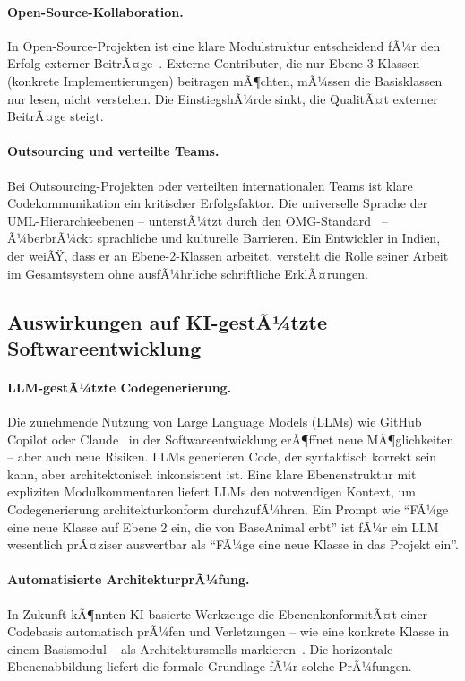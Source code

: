 ﻿\documentclass[a4paper,12pt]{article}
\begin{document}
\paragraph{Open-Source-Kollaboration.}
In Open-Source-Projekten ist eine klare Modulstruktur entscheidend fÃ¼r den
Erfolg externer BeitrÃ¤ge~\cite{raymond1999}. Externe Contributer, die nur
Ebene-3-Klassen (konkrete Implementierungen) beitragen mÃ¶chten, mÃ¼ssen die
Basisklassen nur lesen, nicht verstehen. Die EinstiegshÃ¼rde sinkt, die
QualitÃ¤t externer BeitrÃ¤ge steigt.

\paragraph{Outsourcing und verteilte Teams.}
Bei Outsourcing-Projekten oder verteilten internationalen Teams ist klare
Codekommunikation ein kritischer Erfolgsfaktor. Die universelle Sprache der
UML-Hierarchieebenen -- unterstÃ¼tzt durch den OMG-Standard~\cite{omg2017} --
Ã¼berbrÃ¼ckt sprachliche und kulturelle Barrieren. Ein Entwickler in Indien,
der weiÃŸ, dass er an Ebene-2-Klassen arbeitet, versteht die Rolle seiner
Arbeit im Gesamtsystem ohne ausfÃ¼hrliche schriftliche ErklÃ¤rungen.

\subsection{Auswirkungen auf KI-gestÃ¼tzte Softwareentwicklung}

\paragraph{LLM-gestÃ¼tzte Codegenerierung.}
Die zunehmende Nutzung von Large Language Models (LLMs) wie GitHub Copilot oder
Claude~\cite{chen2021} in der Softwareentwicklung erÃ¶ffnet neue MÃ¶glichkeiten --
aber auch neue Risiken. LLMs generieren Code, der syntaktisch korrekt sein kann,
aber architektonisch inkonsistent ist. Eine klare Ebenenstruktur mit
expliziten Modulkommentaren liefert LLMs den notwendigen Kontext, um
Codegenerierung architekturkonform durchzufÃ¼hren. Ein Prompt wie
\enquote{FÃ¼ge eine neue Klasse auf Ebene 2 ein, die von BaseAnimal erbt} ist
fÃ¼r ein LLM wesentlich prÃ¤ziser auswertbar als \enquote{FÃ¼ge eine neue Klasse
	in das Projekt ein}.

\paragraph{Automatisierte ArchitekturprÃ¼fung.}
In Zukunft kÃ¶nnten KI-basierte Werkzeuge die EbenenkonformitÃ¤t einer Codebasis
automatisch prÃ¼fen und Verletzungen -- wie eine konkrete Klasse in einem
Basismodul -- als Architektursmells markieren~\cite{tamburri2019}. Die horizontale
Ebenenabbildung liefert die formale Grundlage fÃ¼r solche PrÃ¼fungen.
\end{document}
